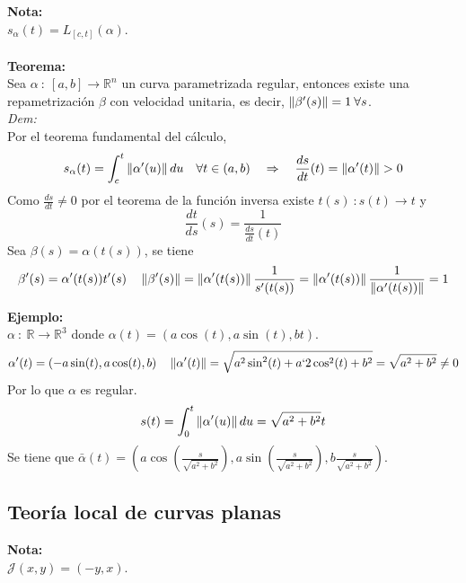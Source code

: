 \documentclass{article}
\begin{document}

\textbf{Nota:}\\
$s_\alpha(t)=L_{[c,t]}(\alpha)$.\\\\


\textbf{Teorema:}\\
Sea $\alpha\::\:[a,b]\longrightarrow\mathbb{R}^n$ un curva parametrizada regular, entonces existe una repametrización $\beta$ con velocidad unitaria, es decir, $\left\|\beta'(s)\right\|=1\:\forall s$.\\
\textit{Dem:}\\
Por el teorema fundamental del cálculo,
$$
s_\alpha(t)=\int_c^t\norma{\alpha'(u)}du \quad \forall t\in(a,b)\quad\Rightarrow\quad\frac{ds}{dt}(t)=\norma{\alpha'(t)}>0
$$
Como $\frac{ds}{dt}\ne0$ por el teorema de la función inversa existe $t(s)\::s(t)\to t$ y
$$
\frac{dt}{ds}(s)=\frac{1}{\frac{ds}{dt}(t)}
$$
Sea $\beta(s)=\alpha(t(s))$, se tiene
$$
\beta'(s)=\alpha'(t(s))t'(s)\quad \left\|\beta'(s)\right\|=\left\|\alpha'(t(s))\right\|\frac{1}{s'(t(s))}=\left\|\alpha'(t(s))\right\|\frac{1}{\left\|\alpha'(t(s))\right\|}=1
$$


\textbf{Ejemplo:}\\
$\alpha\::\:\mathbb{R}\longrightarrow\mathbb{R}^3$ donde $\alpha(t)=(a\cos(t),a\sin(t),bt)$.
$$
\alpha'(t)=(-a\sin(t),a\cos(t),b) \quad \left\|\alpha'(t)\right\|=\sqrt{a^2\sin^2(t)+a`2\cos^2(t)+b^2}=\sqrt{a^2+b^2}\ne0
$$
Por lo que $\alpha$ es regular.
$$
s(t)=\int_0^t\left\|\alpha'(u)\right\|du=\sqrt{a^2+b^2}t
$$
Se tiene que $\bar{\alpha}(t)=\left(a\cos\left(\frac{s}{\sqrt{a^2+b^2}}\right),a\sin\left(\frac{s}{\sqrt{a^2+b^2}}\right),b\frac{s}{\sqrt{a^2+b^2}}\right)$.\newpage


\subsection{Teoría local de curvas planas}


\textbf{Nota:}\\
$\mathcal{J}(x,y)=(-y,x)$.\\

\end{document}
